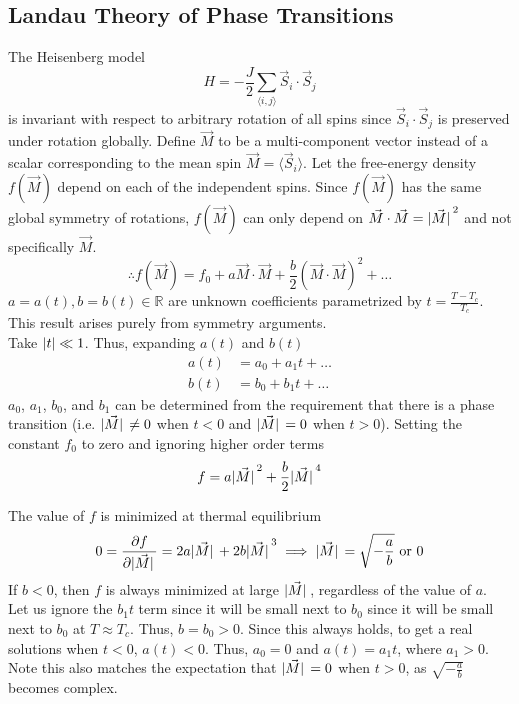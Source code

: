 \documentclass[12pt,a4paper,titlepage]{article}
\newcommand{\trm}[1]{\textrm{#1}} %
\begin{document}
\subsection{Landau Theory of Phase Transitions}
The Heisenberg model
\begin{equation}
H=-\frac{J}{2}\sum_{\langle i,j\rangle}\vec{S}_{i}\cdot\vec{S}_{j}
\end{equation}
is invariant with respect to arbitrary rotation of all spins since $\vec{S}_{i}\cdot\vec{S}_{j}$ is preserved under rotation globally. Define $\vec{M}$ to be a multi-component vector instead of a scalar corresponding to the mean spin $\vec{M}=\langle\vec{S}_{i}\rangle$. Let the free-energy density $f(\vec{M})$ depend on each of the independent spins. Since $f(\vec{M})$ has the same global symmetry of rotations, $f(\vec{M})$ can only depend on $\vec{M}\cdot\vec{M}=\abs*{\vec{M}}^{2}$ and not specifically $\vec{M}$.
\begin{equation}
\therefore f(\vec{M})=f_{0}+a\vec{M}\cdot\vec{M}+\frac{b}{2}(\vec{M}\cdot\vec{M})^{2}+\ldots
\end{equation}
$a=a(t), b=b(t) \in\mathbb{R}$  are unknown coefficients parametrized by $t=\frac{T-T_{c}}{T_{c}}$. This result arises purely from symmetry arguments.\\

Take $\abs{t}\ll1$. Thus, expanding $a(t)$ and $b(t)$
\begin{equation}
\begin{aligned}
a(t)&=a_{0}+a_{1}t+\ldots\\
b(t)&=b_{0}+b_{1}t+\ldots
\end{aligned}
\end{equation}
$a_{0}$, $a_{1}$, $b_{0}$, and $b_{1}$ can be determined from the requirement that there is a phase transition (i.e. $\abs*{\vec{M}}\neq0$ when $t<0$ and $\abs*{\vec{M}}=0$ when $t>0$). Setting the constant $f_{0}$ to zero and ignoring higher order terms
\begin{equation}
f=a\abs*{\vec{M}}^{2}+\frac{b}{2}\abs*{\vec{M}}^{4}
\end{equation}

The value of $f$ is minimized at thermal equilibrium
\begin{equation}
0=\pdv{f}{\abs*{\vec{M}}}=2a\abs*{\vec{M}}+2b\abs*{\vec{M}}^{3}\implies\abs*{\vec{M}}=\sqrt{-\frac{a}{b}}\trm{ or }0
\end{equation}
If $b<0$, then $f$ is always minimized at large $\abs*{\vec{M}}$, regardless of the value of $a$. Let us ignore the $b_{1}t$ term since it will be small next to $b_{0}$ since it will be small next to $b_{0}$ at $T\approx T_{c}$. Thus, $b=b_{0}>0$. Since this always holds, to get a real solutions when $t<0$, $a(t)<0$. Thus, $a_{0}=0$ and $a(t)=a_{1}t$, where $a_{1}>0$. Note this also matches the expectation that $\abs*{\vec{M}}=0$ when $t>0$, as $\sqrt{-\frac{a}{b}}$ becomes complex.\\
\end{document}
